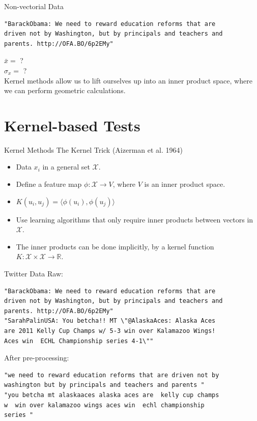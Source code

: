 \documentclass{beamer}
\begin{document}
\begin{frame}[fragile]{Non-vectorial Data}
\begin{verbatim}
"BarackObama: We need to reward education reforms that are
driven not by Washington, but by principals and teachers and
parents. http://OFA.BO/6p2EMy"
\end{verbatim}
\pause

$\bar{x} = $ ? \\ \pause
$\hat{\sigma}_x = $ ? \\ \pause
Kernel methods allow us to lift ourselves up into an inner product space, where we can perform geometric calculations.
\end{frame}

\section{Kernel-based Tests}
\begin{frame}{Kernel Methods}
  The Kernel Trick (Aizerman et al. 1964)
  \begin{itemize}
  \item Data $x_i$ in a general set $\mathcal{X}$. \pause
  \item Define a feature map $\phi : \mathcal{X} \to V$, where $V$ is an inner product space. \pause
  \item $K(u_i, u_j) = \langle \phi(u_i), \phi(u_j) \rangle$ \pause
  \item Use learning algorithms that only require inner products between vectors in $\mathcal{X}$. \pause
  \item The inner products can be done implicitly, by a kernel function $K: \mathcal{X} \times \mathcal{X} \to \mathbb{R}$.
  \end{itemize}
\end{frame}

\begin{frame}[fragile]{Twitter Data}
  Raw:
\begin{verbatim}
"BarackObama: We need to reward education reforms that are
driven not by Washington, but by principals and teachers and
parents. http://OFA.BO/6p2EMy"
"SarahPalinUSA: You betcha!! MT \"@AlaskaAces: Alaska Aces
are 2011 Kelly Cup Champs w/ 5-3 win over Kalamazoo Wings!
Aces win  ECHL Championship series 4-1\""
\end{verbatim}
  After pre-processing:
\begin{verbatim}
"we need to reward education reforms that are driven not by
washington but by principals and teachers and parents "
"you betcha mt alaskaaces alaska aces are  kelly cup champs
w  win over kalamazoo wings aces win  echl championship
series "
\end{verbatim}
\end{frame}
\end{document}
